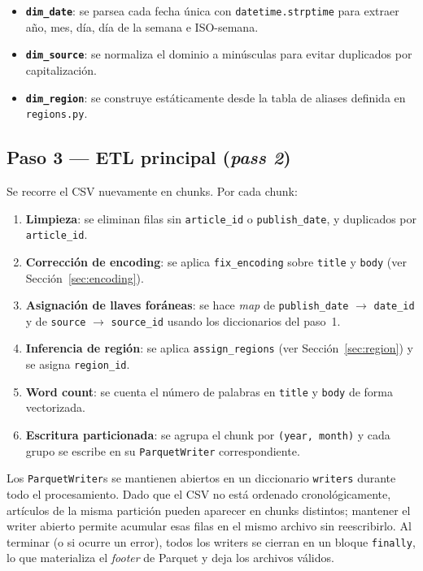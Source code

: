 \documentclass[11pt, letterpaper]{article}
\begin{document}
\begin{itemize}[noitemsep]
  \item \textbf{\texttt{dim\_date}}: se parsea cada fecha única con
    \texttt{datetime.strptime} para extraer año, mes, día, día de la semana
    e ISO-semana.
  \item \textbf{\texttt{dim\_source}}: se normaliza el dominio a minúsculas
    para evitar duplicados por capitalización.
  \item \textbf{\texttt{dim\_region}}: se construye estáticamente desde la
    tabla de aliases definida en \texttt{regions.py}.
\end{itemize}

\subsection{Paso 3 --- ETL principal (\textit{pass 2})}

Se recorre el CSV nuevamente en chunks. Por cada chunk:

\begin{enumerate}[noitemsep]
  \item \textbf{Limpieza}: se eliminan filas sin \texttt{article\_id} o
    \texttt{publish\_date}, y duplicados por \texttt{article\_id}.
  \item \textbf{Corrección de encoding}: se aplica \texttt{fix\_encoding}
    sobre \texttt{title} y \texttt{body} (ver Sección~\ref{sec:encoding}).
  \item \textbf{Asignación de llaves foráneas}: se hace \textit{map} de
    \texttt{publish\_date} $\to$ \texttt{date\_id} y de \texttt{source}
    $\to$ \texttt{source\_id} usando los diccionarios del paso~1.
  \item \textbf{Inferencia de región}: se aplica \texttt{assign\_regions}
    (ver Sección~\ref{sec:region}) y se asigna \texttt{region\_id}.
  \item \textbf{Word count}: se cuenta el número de palabras en
    \texttt{title} y \texttt{body} de forma vectorizada.
  \item \textbf{Escritura particionada}: se agrupa el chunk por
    \texttt{(year, month)} y cada grupo se escribe en su \texttt{ParquetWriter}
    correspondiente.
\end{enumerate}

Los \texttt{ParquetWriter}s se mantienen abiertos en un diccionario
\texttt{writers} durante todo el procesamiento. Dado que el CSV no está
ordenado cronológicamente, artículos de la misma partición pueden aparecer en
chunks distintos; mantener el writer abierto permite acumular esas filas en
el mismo archivo sin reescribirlo. Al terminar (o si ocurre un error),
todos los writers se cierran en un bloque \texttt{finally}, lo que
materializa el \textit{footer} de Parquet y deja los archivos válidos.
\end{document}
